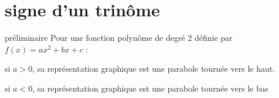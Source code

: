 \section{signe d'un trinôme}

    \begin{remarqueTitre}{préliminaire}
        Pour une fonction polynôme de degré 2 définie par $f(x)=ax^2+bx+c$ :
        \begin{itemRem}
            \item si $a > 0$, sa représentation graphique est une parabole tournée vers le haut.
            \item si $a < 0$, sa représentation graphique est une parabole tournée vers le bas
        \end{itemRem}
    \end{remarqueTitre}
    
